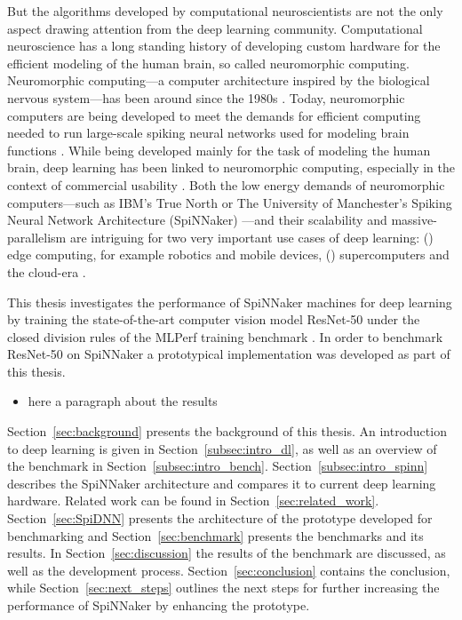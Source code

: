 \documentclass[]{article}
\begin{document}
But the algorithms developed by computational neuroscientists are not
the only aspect drawing attention from the deep learning community.
Computational neuroscience has a long standing history of
developing custom hardware for the efficient modeling of the human
brain, so called neuromorphic computing. Neuromorphic computing---a
computer architecture inspired by the biological nervous system---has
been around since the 1980s \citep{mead_1989}.
Today, neuromorphic computers are being developed to meet the
demands for efficient computing needed to run large-scale
spiking neural networks used for modeling brain
functions \citep{furber_2016}.
While being developed mainly for the task of modeling the human brain,
deep learning has been linked to neuromorphic computing,
especially in the context of commercial usability \citep{gomes_2017}.
Both the low energy demands of neuromorphic computers---such as IBM's
True North \citep{cassidy_et_al_2013} or The University of
Manchester's Spiking Neural Network Architecture (SpiNNaker)
\citep{furber_et_al_2006}---and their
scalability and massive-parallelism are intriguing for two very
important use cases of deep learning:
() edge computing, for example robotics
and mobile devices, () supercomputers and the
cloud-era \citep{gomes_2017}.

This thesis investigates the performance of SpiNNaker machines for
deep learning by training the state-of-the-art computer vision model
ResNet-50 \citep{he_et_al_2015} under the closed division rules of the
MLPerf training benchmark \citep{mattson_et_al_2019}.
In order to benchmark ResNet-50 on SpiNNaker a prototypical
implementation was developed as part of this thesis.

\begin{itemize}
  \item here a paragraph about the results
\end{itemize}

Section~\ref{sec:background} presents the background of this thesis.
An introduction to deep learning is given in
Section~\ref{subsec:intro_dl}, as well as an overview
of the benchmark in Section~\ref{subsec:intro_bench}.
Section~\ref{subsec:intro_spinn} describes the SpiNNaker architecture
and compares it to current deep learning hardware.
Related work can be found in Section~\ref{sec:related_work}.
Section~\ref{sec:SpiDNN} presents the architecture of the
prototype developed for benchmarking and Section~\ref{sec:benchmark}
presents the benchmarks and its results.
In Section~\ref{sec:discussion} the results of the benchmark are
discussed, as well as the development process.
Section~\ref{sec:conclusion} contains the conclusion, while
Section~\ref{sec:next_steps} outlines the next steps for further
increasing the performance of SpiNNaker by enhancing the
prototype.
\end{document}
